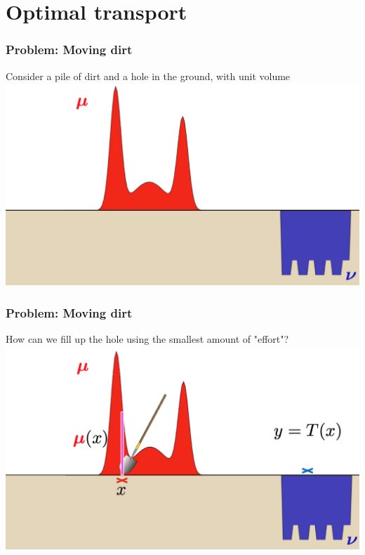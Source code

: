 \documentclass[mathserif,compress,xcolor={dvipsnames}]{beamer}
\renewcommand\;{\,}
\begin{document}
\section{Optimal transport}

\begin{frame}\frametitle{Problem: Moving dirt}
Consider a pile of dirt and a hole in the ground, with unit volume
\bigskip
\includegraphics[width=\linewidth]{Figures/EMD_setup.png}
\end{frame}

\begin{frame}\frametitle{Problem: Moving dirt}
How can we fill up the hole using the smallest amount of "effort"?
\bigskip
\includegraphics[width=\linewidth]{Figures/EMD_shovel.png}
\end{frame}
\end{document}
